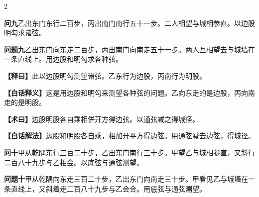 \documentclass[11pt,a4paper]{article}
\newcommand{\WenQuestion}[1]{\textbf{\textcolor{classicalcolor}{#1}}}
\newcommand{\BaiQuestion}[1]{\textbf{\textcolor{moderncolor}{#1}}}
\newcommand{\WenExplain}{\textcolor{classicalcolor}{\textbf{【释曰】}}}
\newcommand{\BaiExplain}{\textcolor{moderncolor}{\textbf{【白话释义】}}}
\newcommand{\WenMethod}{\textcolor{classicalcolor}{\textbf{【术曰】}}}
\newcommand{\BaiMethod}{\textcolor{moderncolor}{\textbf{【白话解法】}}}
\begin{document}
\begin{paracol}{2}
\vspace{0.8em}

\switchcolumn*
\begin{tcolorbox}[colback=red!3,colframe=red!30!black,boxrule=0.3pt]
\WenQuestion{问九}\quad 乙出东门东行二百步，丙出南门南行五十一步。二人相望与城相参直。以边股明勾求诸弦。
\end{tcolorbox}
\switchcolumn
\begin{tcolorbox}[colback=blue!3,colframe=blue!30!black,boxrule=0.3pt]
\BaiQuestion{问题九}\quad 乙出东门向东走二百步，丙出南门向南走五十一步。两人互相望去与城墙在一条直线上。用边股和明勾求各种弦。
\end{tcolorbox}

\switchcolumn*
\begin{tcolorbox}[colback=red!5,colframe=red!30!black,boxrule=0.3pt]
\WenExplain\quad 此以边股明勾测望诸弦。乙东行为边股，丙南行为明股。
\end{tcolorbox}
\switchcolumn
\begin{tcolorbox}[colback=blue!5,colframe=blue!30!black,boxrule=0.3pt]
\BaiExplain\quad 这是用边股和明勾来测望各种弦的问题。乙向东走的是边股，丙向南走的是明股。
\end{tcolorbox}

\switchcolumn*
\begin{tcolorbox}[colback=red!5,colframe=red!40!black,boxrule=0.3pt]
\WenMethod\quad 边股明股各自乘相併开方得边弦。以通弦减之得城径。
\end{tcolorbox}
\switchcolumn
\begin{tcolorbox}[colback=blue!5,colframe=blue!40!black,boxrule=0.3pt]
\BaiMethod\quad 边股和明股各自乘，相加开平方得边弦。用通弦减去边弦，得城径。
\end{tcolorbox}

\vspace{0.8em}

\switchcolumn*
\begin{tcolorbox}[colback=red!3,colframe=red!30!black,boxrule=0.3pt]
\WenQuestion{问十}\quad 甲从乾隅东行三百二十步，乙出东门南行三十步。甲望乙与城相参直，又斜行二百八十九步与乙相会。以底弦与通弦测望。
\end{tcolorbox}
\switchcolumn
\begin{tcolorbox}[colback=blue!3,colframe=blue!30!black,boxrule=0.3pt]
\BaiQuestion{问题十}\quad 甲从乾隅向东走三百二十步，乙出东门向南走三十步。甲看见乙与城墙在一条直线上，又斜着走二百八十九步与乙会合。用底弦与通弦测望。
\end{tcolorbox}


\end{paracol}
\end{document}
